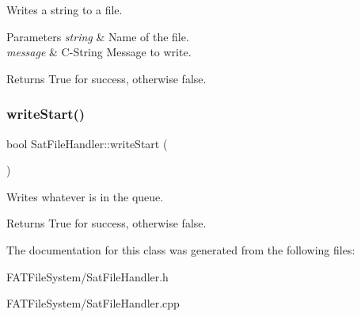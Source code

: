 Writes a string to a file. 


\begin{DoxyParams}{Parameters}
{\em string} & Name of the file. \\
\hline
{\em message} & C-\/\+String Message to write. \\
\hline
\end{DoxyParams}
\begin{DoxyReturn}{Returns}
True for success, otherwise false. 
\end{DoxyReturn}
\mbox{\label{class_sat_file_handler_a458d6cf20f9384c4ef1c0ce3f57d1ab1}} 
\subsubsection{\texorpdfstring{writeStart()}{writeStart()}}
{\footnotesize\ttfamily bool Sat\+File\+Handler\+::write\+Start (\begin{DoxyParamCaption}{ }\end{DoxyParamCaption})}



Writes whatever is in the queue. 

\begin{DoxyReturn}{Returns}
True for success, otherwise false. 
\end{DoxyReturn}


The documentation for this class was generated from the following files\+:\begin{DoxyCompactItemize}
\item 
F\+A\+T\+File\+System/Sat\+File\+Handler.\+h\item 
F\+A\+T\+File\+System/Sat\+File\+Handler.\+cpp\end{DoxyCompactItemize}
